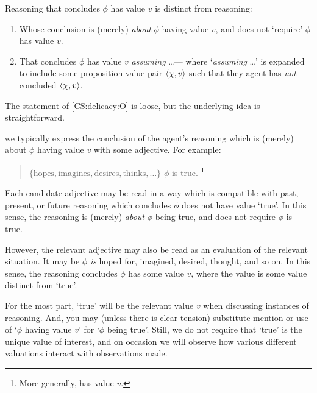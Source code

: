 \begin{note}
  Reasoning that concludes \(\phi\) has value \(v\) is distinct from reasoning:
  \begin{enumerate}[label=\Alph*., ref=(\Alph*)]
  \item
    \label{CS:delicacy:O}
    Whose conclusion is (merely) \emph{about} \(\phi\) having value \(v\), and does not `require' \(\phi\) has value \(v\).
  \item
    \label{CS:delicacy:A}
    That concludes \(\phi\) has value \(v\) \emph{assuming} \dots\space --- where `\emph{assuming} \dots\space' is expanded to include some proposition-value pair \(\langle \chi, v \rangle\) such that they agent has \emph{not} concluded \(\langle \chi, v \rangle\).
  \end{enumerate}
\end{note}

\begin{note}
  The statement of \ref{CS:delicacy:O} is loose, but the underlying idea is straightforward.

  we typically express the conclusion of the agent's reasoning which is (merely) about \(\phi\) having value \(v\) with some adjective.
  For example:

  \begin{quote}
    \vAgent{} \(\{ \text{hopes}, \text{imagines}, \text{desires}, \text{thinks}, \dots \}\) \(\phi\) is true.%
    \footnote{
      More generally, has value \(v\).
    }
  \end{quote}
  Each candidate adjective may be read in a way which is compatible with past, present, or future reasoning which concludes \(\phi\) does not have value `true'.
  In this sense, the reasoning is (merely) \emph{about} \(\phi\) being true, and does not require \(\phi\) is true.

  However, the relevant adjective may also be read as an evaluation of the relevant situation.
  It may be \(\phi\) \emph{is} hoped for, imagined, desired, thought, and so on.
  In this sense, the reasoning concludes \(\phi\) has some value \(v\), where the value is some value distinct from `true'.

  For the most part, `true' will be the relevant value \(v\) when discussing instances of reasoning.
  And, you may (unless there is clear tension) substitute mention or use of `\(\phi\) having value \(v\)' for `\(\phi\) being true'.
  Still, we do not require that `true' is the unique value of interest, and on occasion we will observe how various different valuations interact with observations made.
\end{note}

